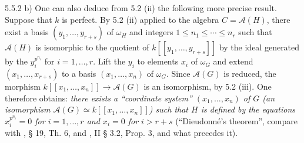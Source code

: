 \begin{remarks}{5.5.2}
b) One can also deduce from 5.2 (ii) the following more precise result. Suppose that $k$ is perfect. By 5.2 (ii) applied to the algebra $C=\mathscr A(H)$, there exist a basis $(y_1,\ldots,y_{r+s})$ of $\omega_H$ and integers $1\le n_1\le\cdots\le n_r$ such that $\mathscr A(H)$ is isomorphic to the quotient of $k[[y_1,\ldots,y_{r+s}]]$ by the ideal generated by the $y_i^{p^{n_i}}$ for $i=1,\ldots,r$. Lift the $y_i$ to elements $x_i$ of $\omega_G$ and extend $(x_1,\ldots,x_{r+s})$ to a basis $(x_1,\ldots,x_n)$ of $\omega_G$. Since $\mathscr A(G)$ is reduced, the morphism $k[[x_1,\ldots,x_n]]\to\mathscr A(G)$ is an isomorphism, by 5.2 (iii). One therefore obtains: \emph{there exists a ``coordinate system'' $(x_1,\ldots,x_n)$ of $G$ (\ie an isomorphism $\mathscr A(G)\simeq k[[x_1,\ldots,x_n]]$) such that $H$ is defined by the equations $x_i^{p^{n_i}}=0$ for $i=1,\ldots,r$ and $x_i=0$ for $i>r+s$} (``Dieudonné's theorem'', compare with \cite{Di55}, § 19, Th. 6, and \cite{Di73}, II § 3.2, Prop. 3, and what precedes it).
\end{remarks}

